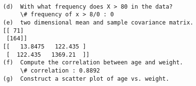 \documentclass[11pt]{article}
\begin{document}
    \begin{center}
    \end{center}
    { \hspace*{\fill} \\}
    
    \begin{Verbatim}[commandchars=\\\{\}]
(d)  With what frequency does X > 80 in the data?
     \# frequency of x > 8/0 : 0 
(e)  two dimensional mean and sample covariance matrix.
[[ 71]
 [164]]
[[   13.8475   122.435 ]
 [  122.435   1369.21  ]]
(f)  Compute the correlation between age and weight.
     \# correlation : 0.8892
(g)  Construct a scatter plot of age vs. weight.

    \end{Verbatim}

    \begin{center}
    \end{center}
    { \hspace*{\fill} \\}
    
\end{document}

